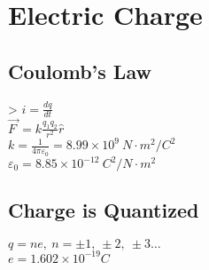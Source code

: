 \section{Electric Charge}
\subsection{Coulomb's Law}
> $i=\frac{dq}{dt}$\\
$\vec{F\:}=k\frac{q_1q_2}{r^2}\widehat{r}$\\
$k=\frac{1}{4\pi \varepsilon_0}=8.99\times 10^9\:N\cdot m^2/C^2$\\
$\varepsilon_0=8.85\times 10^{-12}\:C^2/N\cdot m^2$\\
\subsection{Charge is Quantized}
$q=ne,\:n=\pm 1,\:\pm 2,\:\pm 3\dots $\\
$e=1.602\times 10^{-19}C$\\